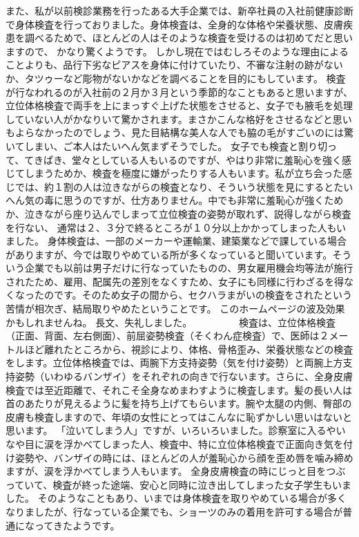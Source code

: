 また、私が以前検診業務を行ったある大手企業では、新卒社員の入社前健康診断で身体検査を行っておりました。身体検査は、全身的な体格や栄養状態、皮膚疾患を調べるためで、ほとんどの人はそのような検査を受けるのは初めてだと思いますので、
かなり驚くようです。
しかし現在ではむしろそのような理由によることよりも、品行下劣なピアスを身体に付けていたり、不審な注射の跡がないか、タツゥーなど彫物がないかなどを調べることを目的にもしています。
検査が行なわれるのが入社前の２月か３月という季節的なこともあると思いますが、立位体格検査で両手を上にまっすぐ上げた状態をさせると、女子でも腋毛を処理していない人がかなりいて驚かされます。まさかこんな格好をさせるなどと思いもよらなかったのでしょう、見た目結構な美人な人でも脇の毛がすごいのには驚いてしまい、ご本人はたいへん気まずそうでした。
女子でも検査と割り切って、てきぱき、堂々としている人もいるのですが、やはり非常に羞恥心を強く感じてしまうためか、検査を極度に嫌がったりする人もいます。私が立ち会った感じでは、約１割の人は泣きながらの検査となり、そういう状態を見にするとたいへん気の毒に思うのですが、仕方ありません。中でも非常に羞恥心が強くためか、泣きながら座り込んでしまって立位検査の姿勢が取れず、説得しながら検査を行ない、
通常は２、３分で終るところが１０分以上かかってしまった人もいました。
身体検査は、一部のメーカーや運輸業、建築業などで課している場合がありますが、今では取りやめている所が多くなっていると聞いています。そういう企業でも以前は男子だけに行なっていたものの、男女雇用機会均等法が施行されたため、雇用、配属先の差別をなくすため、女子にも同様に行わざるを得なくなったのです。そのため女子の間から、セクハラまがいの検査をされたという苦情が相次ぎ、結局取りやめたということです。
このホームページの波及効果かもしれませんね。
長文、失礼しました。　　　　　
検査は、立位体格検査（正面、背面、左右側面）、前屈姿勢検査（そくわん症検査）で、医師は２メートルほど離れたところから、視診により、体格、骨格歪み、栄養状態などの検査をします。立位体格検査では、両腕下方支持姿勢（気を付け姿勢）と両腕上方支持姿勢（いわゆるバンザイ）をそれぞれの向きで行ないます。さらに、全身皮膚検査では至近距離で、それこそ全身なめまわすように検査します。髪の長い人は首のあたりが見えるように髪を持ち上げてもらいます。腕や太腿の内側、臀部の皮膚も検査しますので、年頃の女性にとってはこんなに恥ずかしい思いはないと思います。
「泣いてしまう人」ですが、いろいろいました。診察室に入るやいなや目に涙を浮かべてしまった人、検査中、特に立位体格検査で正面向き気を付け姿勢や、バンザイの時には、ほとんどの人が羞恥心から顔を歪め唇を噛み締めますが、涙を浮かべてしまう人もいます。
全身皮膚検査の時にじっと目をつぶっていて、検査が終った途端、安心と同時に泣き出してしまった女子学生もいました。
そのようなこともあり、いまでは身体検査を取りやめている場合が多くなりましたが、行なっている企業でも、ショーツのみの着用を許可する場合が普通になってきたようです。
